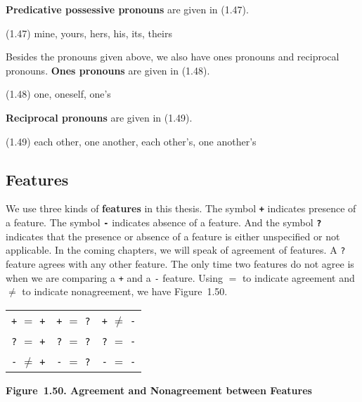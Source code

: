 \documentclass{article}
\begin{document}
\textbf{Predicative possessive pronouns} are given in (1.47).

\begin{enumerate*}
\item[(1.47)] mine, yours, hers, his, its, theirs
\end{enumerate*}

Besides the pronouns given above, we also have
ones pronouns and reciprocal pronouns.
\textbf{Ones pronouns} are given
in (1.48).

\begin{enumerate*}
\item[(1.48)] one, oneself, one's
\end{enumerate*}

\textbf{Reciprocal pronouns} are given in (1.49).

\begin{enumerate*}
\item[(1.49)] each other, one another, each other's, one
another's
\end{enumerate*}


\subsection{Features}

We use three kinds of \textbf{features} in this thesis. The
symbol \textbf{\texttt{+}} indicates presence of a feature. The
symbol \textbf{\texttt{-}} indicates absence of a feature. And
the symbol \textbf{\texttt{?}} indicates that the presence or
absence of a feature is either unspecified or not applicable. In
the coming chapters, we will speak of agreement of features. A
\texttt{?} feature agrees with any other feature. The only time
two features do not agree is when we are comparing a \texttt{+}
and a \texttt{-} feature. Using ${\bm{=}}$ to indicate agreement
and ${\bm{\ne}}$ to indicate nonagreement, we have Figure~1.50.

\bigbreak
\begin{table}[h!]
\centering
\begin{tabular}{ccc}
\texttt{+} ${=}$ \texttt{+} & \texttt{+} ${=}$ \texttt{?} & \texttt{+} ${\ne}$ \texttt{-} \\
\texttt{?} ${=}$ \texttt{+} & \texttt{?} ${=}$ \texttt{?} & \texttt{?} ${=}$ \texttt{-} \\
\texttt{-} ${\ne}$ \texttt{+} & \texttt{-} ${=}$ \texttt{?} & \texttt{-} ${=}$ \texttt{-}
\end{tabular}
\end{table}
\textbf{Figure~1.50. Agreement and Nonagreement between Features}
\bigbreak
\end{document}
